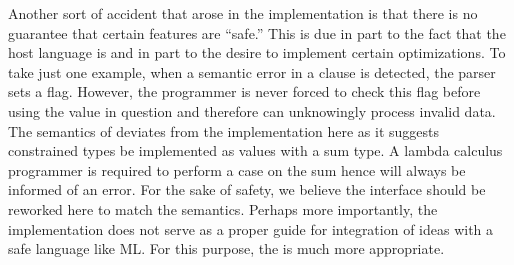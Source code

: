 
Another sort of accident that arose in the
\pads{} implementation is that there is no guarantee that
certain features are ``safe.''  This is due in part to the fact that
the \pads{} host language is \C{} and in part to the desire to implement
certain optimizations.  To take just one example, when a 
semantic error in a \Pwhere{} clause is detected, the parser sets a flag.  
However, the \C{} programmer is never forced to check this flag before using 
the value in question and therefore can unknowingly process invalid data.  The 
semantics of \ddc deviates from the \C{} implementation here as it suggests
constrained types be implemented as values with a sum type.  A lambda
calculus programmer is required to perform a case on the sum 
hence will always be informed of an error.
For the sake of safety, we believe the \C{} interface should be reworked 
here to match the semantics.  
Perhaps more importantly, the \C{} implementation does not serve as a
proper guide for integration of \pads{} ideas with a safe language like ML.
For this purpose, the \ddc{} is much more appropriate.






